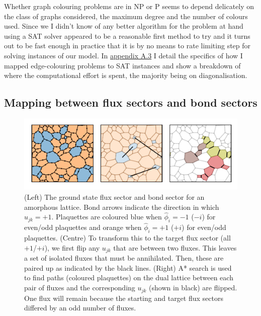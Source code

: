 Whether graph colouring problems are in NP or P seems to depend delicately on the class of graphs considered, the maximum degree and the number of colours used. Since we I didn't know of any better algorithm for the problem at hand using a SAT solver appeared to be a reasonable first method to try and it turns out to be fast enough in practice that it is by no means to rate limiting step for solving instances of our model. In \protect\hyperlink{app-lattice-generation}{appendix A.3} I detail the specifics of how I mapped edge-colouring problems to SAT instances and show a breakdown of where the computational effort is spent, the majority being on diagonalisation.

\hypertarget{mapping-between-flux-sectors-and-bond-sectors}{%
\subsection{Mapping between flux sectors and bond sectors}\label{mapping-between-flux-sectors-and-bond-sectors}}

\hypertarget{fig:flux_finding}{%
\begin{figure}
\centering
\includegraphics[width=1\textwidth,height=\textheight]{figure_code/amk_chapter/flux_finding/flux_finding}
\caption[{Finding Bond Sectors from Flux Sectors}]{(Left) The ground state flux sector and bond sector for an amorphous lattice. Bond arrows indicate the direction in which \(u_{jk} = +1\). Plaquettes are coloured blue when \(\hat{\phi}_i = -1\) (\(-i\)) for even/odd plaquettes and orange when \(\hat{\phi}_i = +1\) (\(+i\)) for even/odd plaquettes. (Centre) To transform this to the target flux sector (all \(+1\)/\(+i\)), we first flip any \(u_{jk}\) that are between two fluxes. This leaves a set of isolated fluxes that must be annihilated. Then, these are paired up as indicated by the black lines. (Right) A* search is used to find paths (coloured plaquettes) on the dual lattice between each pair of fluxes and the corresponding \(u_{jk}\) (shown in black) are flipped. One flux will remain because the starting and target flux sectors differed by an odd number of fluxes.}
\label{fig:flux_finding}
\end{figure}
}

